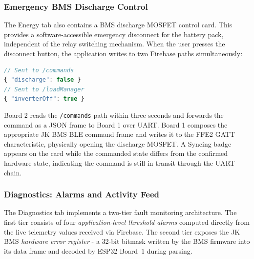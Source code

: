 \documentclass[12pt, a4paper]{report}
\begin{document}
{\subsubsection{Emergency BMS Discharge Control}

The Energy tab also contains a BMS discharge MOSFET control card. This provides
a software-accessible emergency disconnect for the battery pack, independent of
the relay switching mechanism. When the user presses the disconnect button, the
application writes to two Firebase paths simultaneously:

\begin{lstlisting}[language=JavaScript, caption={BMS Discharge Command Write}]
// Sent to /commands
{ "discharge": false }
// Sent to /loadManager
{ "inverterOff": true }
\end{lstlisting}

Board 2 reads the \texttt{/commands} path within three seconds and forwards
the command as a JSON frame to Board 1 over UART. Board 1 composes the
appropriate JK BMS BLE command frame and writes it to the FFE2 GATT
characteristic, physically opening the discharge MOSFET. A Syncing badge
appears on the card while the commanded state differs from the confirmed
hardware state, indicating the command is still in transit through the UART
chain.

\subsubsection{Diagnostics: Alarms and Activity Feed}
The Diagnostics tab implements a two-tier fault monitoring architecture.
The first tier consists of four \emph{application-level threshold alarms}
computed directly from the live telemetry values received via Firebase.
The second tier exposes the JK BMS \emph{hardware error register} - a
32-bit bitmask written by the BMS firmware into its data frame and decoded
by ESP32 Board~1 during parsing.
}
\end{document}
